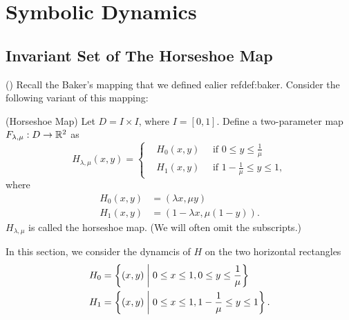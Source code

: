 \documentclass[12pt,twoside]{book}
\begin{document}
\chapter{Symbolic Dynamics}
\section{Invariant Set of The Horseshoe Map}
(\citep{wiggins})
Recall the Baker's mapping that we defined ealier ref{def:baker}.
Consider the following variant of this mapping:
\begin{definition}
  (Horseshoe Map)
  Let $D = I \times I$, where $I = [0,1]$.
  Define a two-parameter map $F_{\lambda, \mu}: D \to \mathbb{R}^2$ as
  \begin{equation*}
    H_{\lambda, \mu}(x,y) =
    \begin{cases}
      &H_0(x,y) \quad\mbox{ if } 0 \leq y \leq \frac{1}{\mu}   \\
      &H_1(x,y) \quad\mbox{ if } 1 - \frac{1}{\mu} \leq y \leq 1,
    \end{cases}
  \end{equation*}
  where
  \begin{align*}
    H_0(x,y) &= (\lambda x, \mu y)  \\
    H_1(x,y) &= (1 - \lambda x, \mu(1 - y)).
  \end{align*}
  $H_{\lambda, \mu}$ is called the horseshoe map.
  (We will often omit the subscripts.)
\end{definition}
In this section, we consider the dynamcis of $H$ on the two horizontal rectangles 
\begin{align*}
  H_0 &= \left \{ (x,y) \mathrel{} \middle| \mathrel{}  0 \leq x \leq 1, 0 \leq y \leq \frac{1}{\mu} \right \}  \\
  H_1 &= \left \{ (x,y) \mathrel{} \middle| \mathrel{}  0 \leq x \leq 1, 1 - \frac{1}{\mu} \leq y \leq 1 \right \}.
\end{align*}
\end{document}
